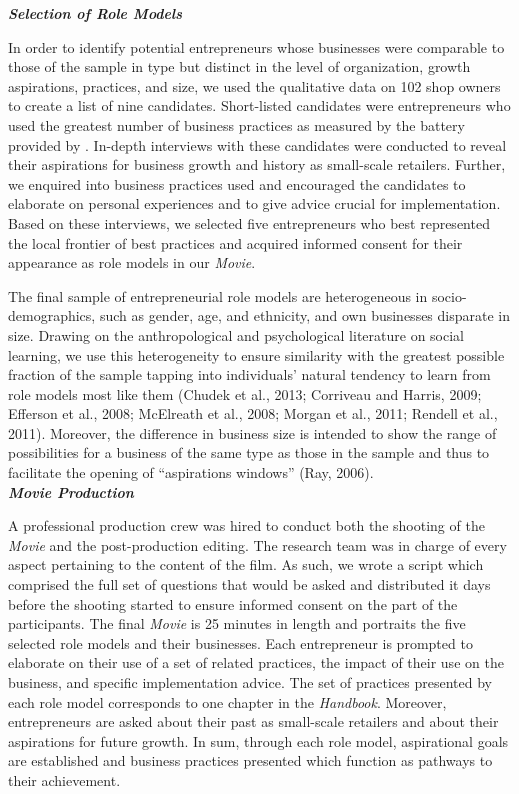 \documentclass[11.5pt]{article}
\begin{document}
\emph{\textbf{Selection of Role Models}}\

\noindent In order to identify potential entrepreneurs whose businesses were comparable to those of the sample in type but distinct in the level of organization, growth aspirations, practices, and size, we used the qualitative data on 102 shop owners to create a list of nine candidates. Short-listed candidates were entrepreneurs who used the greatest number of business practices as measured by the battery provided by \citet{McKenzie2017}. In-depth interviews with these candidates were conducted to reveal their aspirations for business growth and history as small-scale retailers. Further, we enquired into business practices used and encouraged the candidates to elaborate on personal experiences and to give advice crucial for implementation. Based on these interviews, we selected five entrepreneurs who best represented the local frontier of best practices and acquired informed consent for their appearance as role models in our \emph{Movie}.

The final sample of entrepreneurial role models are heterogeneous in socio-demographics, such as gender, age, and ethnicity, and own businesses disparate in size. Drawing on the anthropological and psychological literature on social learning, we use this heterogeneity to ensure similarity with the greatest possible fraction of the sample tapping into individuals' natural tendency to learn from role models most like them (Chudek et al., 2013; Corriveau and Harris, 2009; Efferson et al., 2008; McElreath et al., 2008; Morgan et al., 2011; Rendell et al., 2011). Moreover, the difference in business size is intended to show the range of possibilities for a business of the same type as those in the sample and thus to facilitate the opening of ``aspirations windows'' (Ray, 2006).\\

\noindent \emph{\textbf{Movie Production}}\

\noindent A professional production crew was hired to conduct both the shooting of the \emph{Movie} and the post-production editing. The research team was in charge of every aspect pertaining to the content of the film. As such, we wrote a script which comprised the full set of questions that would be asked and distributed it days before the shooting started to ensure informed consent on the part of the participants. The final \emph{Movie} is 25 minutes in length and portraits the five selected role models and their businesses. Each entrepreneur is prompted to elaborate on their use of a set of related practices, the impact of their use on the business, and specific implementation advice. The set of practices presented by each role model corresponds to one chapter in the \emph{Handbook}. Moreover, entrepreneurs are asked about their past as small-scale retailers and about their aspirations for future growth. In sum, through each role model, aspirational goals are established and business practices presented which function as pathways to their achievement. \\
\end{document}
